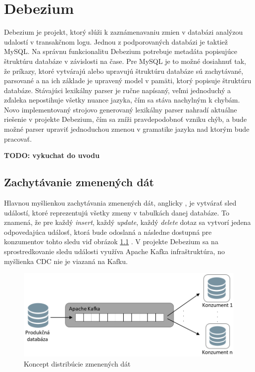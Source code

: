 \chapter{Debezium}
Debezium\cite{Debezium} je projekt, ktorý slúži k zaznámenavaniu zmien v databázi analýzou udalostí v transakčnom logu. Jednou z podporovaných databázi je taktiež MySQL.
Na správnu funkcionalitu Debezium potrebuje metadáta popisujúce štruktúru databáze v závislosti na čase. Pre MySQL je to možné dosiahnuť tak, že príkazy, ktoré vytvárajú alebo upravujú štruktúru databáze sú zachytávané, parsované a na ich základe je upravený model v pamäti, ktorý popisuje štruktúru databáze. Stávajúci lexikálny parser je ručne napísaný, veľmi jednoduchý a zďaleka nepostihuje všetky nuance  jazyka, čím sa stáva nachylným k chybám. Novo implementovaný strojovo generovaný lexikálny parser nahradí aktuálne riešenie v projekte Debezium, čím sa zníži pravdepodobnoť vzniku chýb, a bude možné parser upraviť jednoduchou zmenou v gramatike jazyka nad ktorým bude pracovať.

\textbf{TODO: vykuchat do uvodu}

\section{Zachytávanie zmenených dát}
Hlavnou myšlienkou zachytávania zmenených dát, anglicky , je vytvárať sled událostí, ktoré reprezentujú všetky zmeny v tabulkách danej databáze. To znamená, že pre každý \textit{insert}, každý \textit{update}, každý \textit{delete} dotaz sa vytvorí jedena odpovedajúca událosť, ktorá bude odoslaná a následne dostupná pre konzumentov tohto sledu viď obrázok \ref{fig:CDC} \cite{debezium:devoxx}. V projekte Debezium sa na sprostredkovanie sledu události využíva Apache Kafka \cite{Kafka} infraštruktúra, no myšlienka CDC nie je viazaná na Kafku.

\begin{figure}[H]
\begin{center}
\includegraphics[width=15cm]{figures/CDC_1.PNG}
\caption{Koncept distribúcie zmenených dát}
\label{fig:CDC}
\end{center}
\end{figure}

